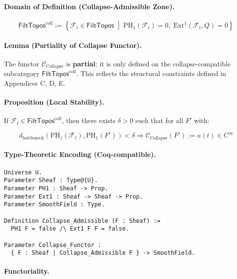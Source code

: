 \documentclass[11pt]{article}
\begin{document}
\begin{axiom}
\begin{axiom}
{{\paragraph{Domain of Definition (Collapse-Admissible Zone).}

\[
\mathsf{FiltTopos}^{\text{coll}} := \left\{
\mathcal{F}_t \in \mathsf{FiltTopos} \;\middle|\;
\mathrm{PH}_1(\mathcal{F}_t) = 0,\; \mathrm{Ext}^1(\mathcal{F}_t, Q) = 0
\right\}
\]

\paragraph{Lemma (Partiality of Collapse Functor).}

The functor \( \mathcal{C}_{\text{Collapse}} \) is \textbf{partial}:  
it is only defined on the collapse-compatible subcategory \( \mathsf{FiltTopos}^{\text{coll}} \).  
This reflects the structural constraints defined in Appendices C, D, E.

\paragraph{Proposition (Local Stability).}

If \( \mathcal{F}_t \in \mathsf{FiltTopos}^{\text{coll}} \),  
then there exists \( \delta > 0 \) such that for all \( F' \) with:

\[
d_{\text{bottleneck}}(\mathrm{PH}_1(\mathcal{F}_t), \mathrm{PH}_1(F')) < \delta
\Rightarrow \mathcal{C}_{\text{Collapse}}(F') := u(t) \in C^\infty
\]

\paragraph{Type-Theoretic Encoding (Coq-compatible).}

\begin{lstlisting}[language=Coq, caption=Collapse Functor Definition in Coq]
Universe U.
Parameter Sheaf : Type@{U}.
Parameter PH1 : Sheaf -> Prop.
Parameter Ext1 : Sheaf -> Sheaf -> Prop.
Parameter SmoothField : Type.

Definition Collapse_Admissible (F : Sheaf) :=
  PH1 F = false /\ Ext1 F F = false.

Parameter Collapse_Functor : 
  { F : Sheaf | Collapse_Admissible F } -> SmoothField.
\end{lstlisting}

\paragraph{Functoriality.}

}}
\end{axiom}
\end{axiom}
\end{document}
